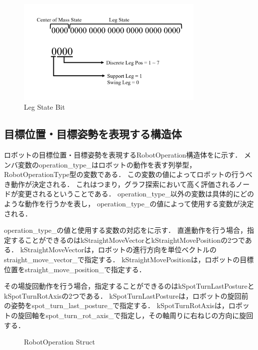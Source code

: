 \begin{figure}[htbp]
  \begin{center}
    \includegraphics[width=90mm, clip]{figure/chapter3/leg_state.png}
    \caption{Leg State Bit}
    \label{fig:leg_state_bit} %
  \end{center}
\end{figure}

\subsection{目標位置・目標姿勢を表現する構造体}
ロボットの目標位置・目標姿勢を表現するRobotOperation構造体をに示す．
メンバ変数のoperation\_type\_はロボットの動作を表す列挙型，RobotOperationType型の変数である．
この変数の値によってロボットの行うべき動作が決定される．
これはつまり，グラフ探索において高く評価されるノードが変更されるということである．
operation\_type\_以外の変数は具体的にどのような動作を行うかを表し，
operation\_type\_の値によって使用する変数が決定される．

operation\_type\_の値と使用する変数の対応をに示す．
直進動作を行う場合，指定することができるのはkStraightMoveVectorとkStraightMovePositionの2つである．
kStraightMoveVectorは，ロボットの進行方向を単位ベクトルのstraight\_move\_vector\_で指定する．
kStraightMovePositionは，ロボットの目標位置をstraight\_move\_position\_で指定する．

その場旋回動作を行う場合，指定することができるのはkSpotTurnLastPostureとkSpotTurnRotAxisの2つである．
kSpotTurnLastPostureは，ロボットの旋回前の姿勢をspot\_turn\_last\_posture\_で指定する．
kSpotTurnRotAxisは，ロボットの旋回軸をspot\_turn\_rot\_axis\_で指定し，その軸周りに右ねじの方向に旋回する．
\\

\begin{figure}[h]
  \centering
  \caption{RobotOperation Struct}
  \label{fig:robot_operation}  %
\end{figure}


